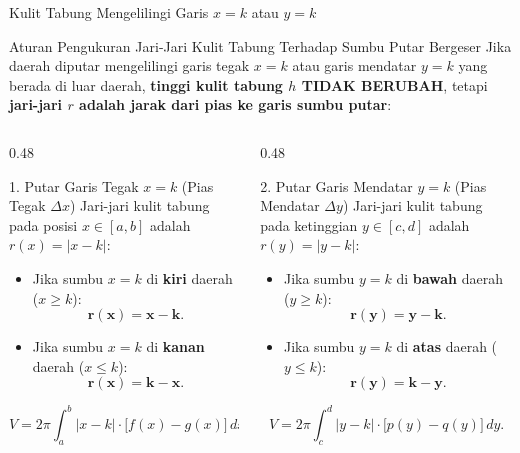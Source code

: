 \documentclass[aspectratio=43,10pt]{beamer}
\begin{document}
\begin{frame}{Kulit Tabung Mengelilingi Garis $x = k$ atau $y = k$}
    \begin{block}{Aturan Pengukuran Jari-Jari Kulit Tabung Terhadap Sumbu Putar Bergeser}
        \scriptsize
        Jika daerah diputar mengelilingi garis tegak $x = k$ atau garis mendatar $y = k$ yang berada di luar daerah, \textbf{tinggi kulit tabung $h$ TIDAK BERUBAH}, tetapi \textbf{jari-jari $r$ adalah jarak dari pias ke garis sumbu putar}:
    \end{block}

    \begin{columns}[T]
        \begin{column}{0.48\textwidth}
            \begin{exampleblock}{1. Putar Garis Tegak $x = k$ (Pias Tegak $\Delta x$)}
                \scriptsize\abovedisplayskip=2pt\belowdisplayskip=2pt
                Jari-jari kulit tabung pada posisi $x \in [a, b]$ adalah $r(x) = |x - k|$:
                \begin{itemize}\itemsep=2pt
                    \item Jika sumbu $x = k$ di \textbf{kiri} daerah ($x \ge k$):
                    $$\mathbf{r(x) = x - k}.$$
                    \item Jika sumbu $x = k$ di \textbf{kanan} daerah ($x \le k$):
                    $$\mathbf{r(x) = k - x}.$$
                \end{itemize}
                $$V = 2\pi\int_{a}^{b} |x - k|\cdot\big[f(x) - g(x)\big]\,dx.$$
            \end{exampleblock}
        \end{column}

        \begin{column}{0.48\textwidth}
            \begin{alertblock}{2. Putar Garis Mendatar $y = k$ (Pias Mendatar $\Delta y$)}
                \scriptsize\abovedisplayskip=2pt\belowdisplayskip=2pt
                Jari-jari kulit tabung pada ketinggian $y \in [c, d]$ adalah $r(y) = |y - k|$:
                \begin{itemize}\itemsep=2pt
                    \item Jika sumbu $y = k$ di \textbf{bawah} daerah ($y \ge k$):
                    $$\mathbf{r(y) = y - k}.$$
                    \item Jika sumbu $y = k$ di \textbf{atas} daerah ($y \le k$):
                    $$\mathbf{r(y) = k - y}.$$
                \end{itemize}
                $$V = 2\pi\int_{c}^{d} |y - k|\cdot\big[p(y) - q(y)\big]\,dy.$$
            \end{alertblock}
        \end{column}
    \end{columns}
\end{frame}
\end{document}
